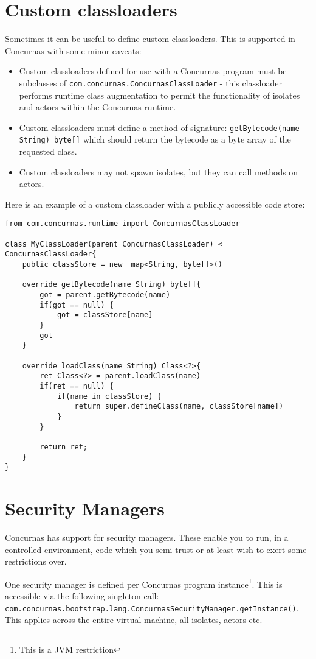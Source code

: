 \documentclass[conc-doc]{subfiles}
\begin{document}
\section{Custom classloaders}
Sometimes it can be useful to define custom classloaders. This is supported in Concurnas with some minor caveats:

\begin{itemize}
	\item Custom classloaders defined for use with a Concurnas program must be subclasses of \lstinline{com.concurnas.ConcurnasClassLoader} - this classloader performs runtime class augmentation to permit the functionality of isolates and actors within the Concurnas runtime.
	\item Custom classloaders must define a method of signature: \lstinline{getBytecode(name String) byte[]} which should return the bytecode as a byte array of the requested class.
	\item Custom classloaders may not spawn isolates, but they can call methods on actors.
\end{itemize}

Here is an example of a custom classloader with a publicly accessible code store:

\begin{lstlisting}
from com.concurnas.runtime import ConcurnasClassLoader

class MyClassLoader(parent ConcurnasClassLoader) < ConcurnasClassLoader{
	public classStore = new  map<String, byte[]>()
	
	override getBytecode(name String) byte[]{
		got = parent.getBytecode(name)
		if(got == null) {
			got = classStore[name]
		}
		got
	}
	
	override loadClass(name String) Class<?>{
		ret Class<?> = parent.loadClass(name)
		if(ret == null) {
			if(name in classStore) {
				return super.defineClass(name, classStore[name])
			}
		}
		
		return ret;
	}
}
\end{lstlisting}

\section{Security Managers}
\label{sec:Security Managers}
Concurnas has support for security managers. These enable you to run, in a controlled environment, code which you semi-trust or at least wish to exert some restrictions over.

One security manager is defined per Concurnas program instance\footnote{This is a JVM restriction}. This is accessible via the following singleton call: \lstinline{com.concurnas.bootstrap.lang.ConcurnasSecurityManager.getInstance()}. This applies across the entire virtual machine, all isolates, actors etc.
\end{document}
